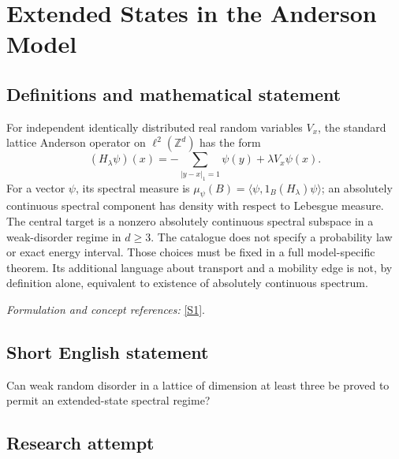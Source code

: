 \documentclass[11pt,a4paper]{article}
\newcommand{\Z}{\mathbb{Z}}
\newcommand{\sref}[2]{\hyperlink{source:#1:#2}{[S#2]}}
\newif\ifshowcatalogue
\newcommand{\cataloguescope}[1]{\ifshowcatalogue
 \paragraph{Exact scope in the supplied catalogue.}
 \begin{quote}\small #1\end{quote}\fi}
\numberwithin{equation}{section}
\begin{document}
\setcounter{section}{0}
\clearpage
\section*{\texorpdfstring{Extended States in the Anderson Model}{Extended States in the Anderson Model}}\label{7900001}
\subsection{Definitions and mathematical statement}
For independent identically distributed real random variables $V_x$, the standard lattice Anderson operator on $\ell^2(\Z^d)$ has the form
\[
 (H_\lambda\psi)(x)=-\sum_{|y-x|_1=1}\psi(y)+\lambda V_x\psi(x).
\]
For a vector $\psi$, its spectral measure is $\mu_\psi(B)=\langle\psi,1_B(H_\lambda)\psi\rangle$; an absolutely continuous spectral component has density with respect to Lebesgue measure. The central target is a nonzero absolutely continuous spectral subspace in a weak-disorder regime in $d\ge3$. The catalogue does not specify a probability law or exact energy interval. Those choices must be fixed in a full model-specific theorem. Its additional language about transport and a mobility edge is not, by definition alone, equivalent to existence of absolutely continuous spectrum.
\par\smallskip\textit{Formulation and concept references:} \sref{7900001}{1}.
\cataloguescope{Prove that the Anderson model, the discrete random Schroedinger operator on Z\textasciicircum{}d with d >= 3, has a regime of absolutely continuous spectrum, equivalently that a conducting phase and a mobility edge exist at weak disorder, so that the metal-insulator transition is established.}
\subsection{Short English statement}
Can weak random disorder in a lattice of dimension at least three be proved to permit an extended-state spectral regime?
\subsection{Research attempt}
\end{document}
